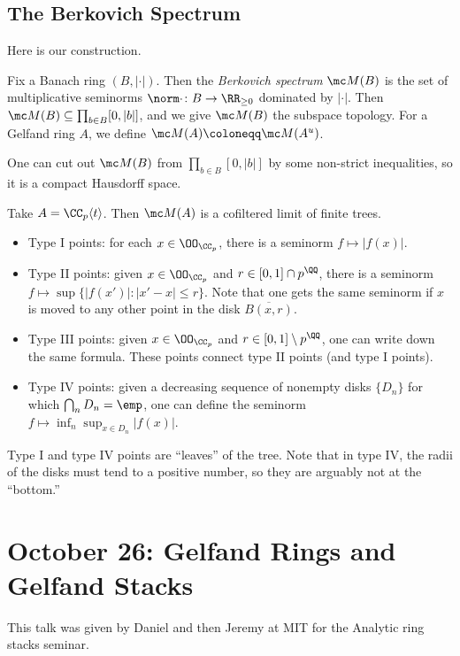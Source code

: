 \documentclass{article}
\begin{document}
\subsection{The Berkovich Spectrum}
Here is our construction.
\begin{definition}
	Fix a Banach ring $(B,\left|\cdot\right|)$. Then the \textit{Berkovich spectrum} $\mc M(B)$ is the set of multiplicative seminorms $\norm\cdot\colon B\to\RR_{\ge0}$ dominated by $\left|\cdot\right|$. Then $\mc M(B)\subseteq\prod_{b\in B}[0,\left|b\right|]$, and we give $\mc M(B)$ the subspace topology. For a Gelfand ring $A$, we define $\mc M(A)\coloneqq\mc M(A^u)$.
\end{definition}
\begin{remark}
	One can cut out $\mc M(B)$ from $\prod_{b\in B}[0,\left|b\right|]$ by some non-strict inequalities, so it is a compact Hausdorff space.
\end{remark}
\begin{example}
	Take $A=\CC_p\langle t\rangle$. Then $\mc M(A)$ is a cofiltered limit of finite trees.
	\begin{itemize}
		\item Type I points: for each $x\in\OO_{\CC_p}$, there is a seminorm $f\mapsto\left|f(x)\right|$.
		\item Type II points: given $x\in\OO_{\CC_p}$ and $r\in[0,1]\cap p^\QQ$, there is a seminorm $f\mapsto\sup\{\left|f(x')\right|:\left|x'-x\right|\le r\}$. Note that one gets the same seminorm if $x$ is moved to any other point in the disk $\overline{B(x,r)}$.
		\item Type III points: given $x\in\OO_{\CC_p}$ and $r\in[0,1]\setminus p^\QQ$, one can write down the same formula. These points connect type II points (and type I points).
		\item Type IV points: given a decreasing sequence of nonempty disks $\{D_n\}$ for which $\bigcap_nD_n=\emp$, one can define the seminorm $f\mapsto\inf_n\sup_{x\in D_n}\left|f(x)\right|$.
	\end{itemize}
	Type I and type IV points are ``leaves'' of the tree. Note that in type IV, the radii of the disks must tend to a positive number, so they are arguably not at the ``bottom.''
\end{example}

\section{October 26: Gelfand Rings and Gelfand Stacks}
This talk was given by Daniel and then Jeremy at MIT for the Analytic ring stacks seminar.
\end{document}
